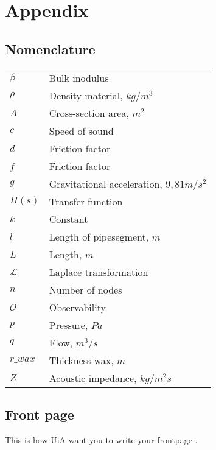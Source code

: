 \appendix
\newpage
{}
{}
\part*{Appendix}

\chapter{Nomenclature}
\begin{table}[h]
	\begin{tabular}{ll}
		$\beta$	& Bulk modulus\\
		$\rho$ 	& Density material, $\si{kg/m^3}$\\
		$A$		& Cross-section area, $\si{m^2}$\\
		$c$		& Speed of sound\\
		$d$		& Friction factor\\
		$f$		& Friction factor\\
		$g$		& Gravitational acceleration, $9,81 \si{m/s^2}$\\
		$H(s)$	& Transfer function\\
		$k$		& Constant\\
		$l$		& Length of pipesegment, $\si{m}$\\		
		$L$		& Length, $\si{m}$\\
		$\mathcal{L}$ & Laplace transformation\\
		$n$		& Number of nodes\\
		$\mathcal{O}$ & Observability\\
		$p$ 	& Pressure, $\si{Pa}$\\
		$q$		& Flow, $\si{m^3/s}$\\
		$r\_wax$	& Thickness wax, $\si{m}$\\
		$Z$		& Acoustic impedance, $\si{kg/m^2 s}$
	\end{tabular}
\end{table}

\chapter{Front page}
This is how UiA want you to write your frontpage \parencite{UiAThesis}.

